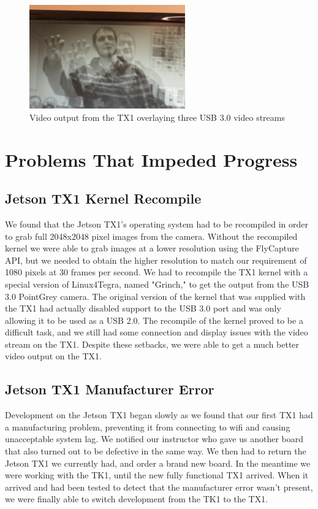 \documentclass[letterpaper,10pt,titlepage]{IEEEtran}
\begin{document}
\begin{figure}[!ht]
  \caption{Video output from the TX1 overlaying three USB 3.0 video streams}
	  \centering
		    \includegraphics[width=0.6\textwidth]{images/3_normal.png}
				\end{figure}
   
\section{Problems That Impeded Progress}
   
   \subsection{Jetson TX1 Kernel Recompile}
   We found that the Jetson TX1's operating system had to be recompiled in order to grab full 2048x2048 pixel images from the camera. Without the recompiled kernel we were able to grab images at a lower resolution using the FlyCapture API, but we needed to obtain the higher resolution to match our requirement of 1080 pixels at 30 frames per second. We had to recompile the TX1 kernel with a special version of Linux4Tegra, named "Grinch," to get the output from the USB 3.0 PointGrey camera. The original version of the kernel that was supplied with the TX1 had actually disabled support to the USB 3.0 port and was only allowing it to be used as a USB 2.0. The recompile of the kernel proved to be a difficult task, and we still had some connection and display issues with the video stream on the TX1. Despite these setbacks, we were able to get a much better video output on the TX1.
   
   \subsection{Jetson TX1 Manufacturer Error}
   Development on the Jetson TX1 began slowly as we found that our first TX1 had a manufacturing problem, preventing it from connecting to wifi and causing unacceptable system lag. We notified our instructor who gave us another board that also turned out to be defective in the same way. We then had to return the Jetson TX1 we currently had, and order a brand new board. In the meantime we were working with the TK1, until the new fully functional TX1 arrived. When it arrived and had been tested to detect that the manufacturer error wasn't present, we were finally able to switch development from the TK1 to the TX1.
   
\end{document}
